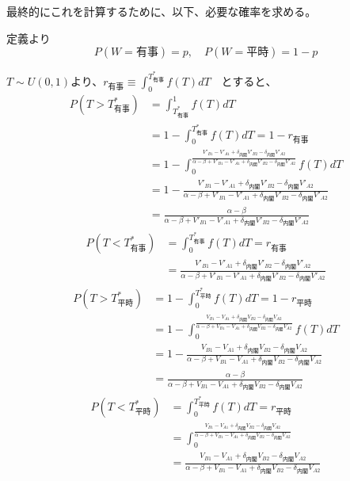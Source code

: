 \documentclass[main.tex]{subfiles}
\begin{document}
最終的にこれを計算するために、以下、必要な確率を求める。

定義より
$$P(W={有事}) = p, \quad P(W={平時}) = 1-p$$


$T \sim U(0,1)$より、$r_{有事} \equiv \int_0^{T^*_{有事}} f(T)dT \quad {とすると、}$
\begin{align*}
    P(T>T^*_{有事}) &= \int_{T^*_{有事}}^1 f(T)dT\\
    &= 1- \int_0^{T^*_{有事}} f(T)dT = 1-r_{有事}\\[0.5em]
    &= 1- \int_0^{ \frac{ V'_{B1} - V'_{A1} +\delta_{内閣}V'_{B2} - \delta_{内閣}V'_{A2} }{ \alpha-\beta + V'_{B1}-V'_{A1} + \delta_{内閣}V'_{B2} - \delta_{内閣}V'_{A2} } } f(T)dT\\[0.5em]
    &= 1 - \frac{ V'_{B1} - V'_{A1} +\delta_{内閣}V'_{B2} - \delta_{内閣}V'_{A2} }{ \alpha-\beta + V'_{B1}-V'_{A1} + \delta_{内閣}V'_{B2} - \delta_{内閣}V'_{A2} }\\[0.5em]
    &= \frac{ \alpha-\beta }{ \alpha-\beta + V'_{B1}-V'_{A1} + \delta_{内閣}V'_{B2} - \delta_{内閣}V'_{A2} } 
\end{align*}
\begin{align*}
    P(T<T^*_{有事}) &= \int_0^{T^*_{有事}} f(T)dT
    = r_{有事}\\[0.5em]
    &= \frac{ V'_{B1} - V'_{A1} +\delta_{内閣}V'_{B2} - \delta_{内閣}V'_{A2} }{ \alpha-\beta + V'_{B1}-V'_{A1} + \delta_{内閣}V'_{B2} - \delta_{内閣}V'_{A2} }
\end{align*}
\begin{align*}
    P(T>T^*_{平時}) &= 1- \int_0^{T^*_{平時}} f(T)dT =  1-r_{平時}\\
    &= 1- \int_0^{\frac{ V_{B1} - V_{A1} +\delta_{内閣}V_{B2} - \delta_{内閣}V_{A2} }{ \alpha-\beta + V_{B1}-V_{A1} + \delta_{内閣}V_{B2} - \delta_{内閣}V_{A2} }} f(T)dT\\[0.5em]
    &= 1 - \frac{ V_{B1} - V_{A1} +\delta_{内閣}V_{B2} - \delta_{内閣}V_{A2} }{ \alpha-\beta + V_{B1}-V_{A1} + \delta_{内閣}V_{B2} - \delta_{内閣}V_{A2} }\\[0.5em]
    &= \frac{ \alpha-\beta  }{ \alpha-\beta + V_{B1}-V_{A1} + \delta_{内閣}V_{B2} - \delta_{内閣}V_{A2} }
\end{align*}
\begin{align*}
    P(T<T^*_{平時}) &= \int_0^{T^*_{平時}} f(T)dT = r_{平時}\\
    &= \int_0^{\frac{ V_{B1} - V_{A1} +\delta_{内閣}V_{B2} - \delta_{内閣}V_{A2} }{ \alpha-\beta + V_{B1}-V_{A1} + \delta_{内閣}V_{B2} - \delta_{内閣}V_{A2} }}\\[0.5em]
    &= \frac{ V_{B1} - V_{A1} +\delta_{内閣}V_{B2} - \delta_{内閣}V_{A2} }{ \alpha-\beta + V_{B1}-V_{A1} + \delta_{内閣}V_{B2} - \delta_{内閣}V_{A2} }
\end{align*}
\end{document}
